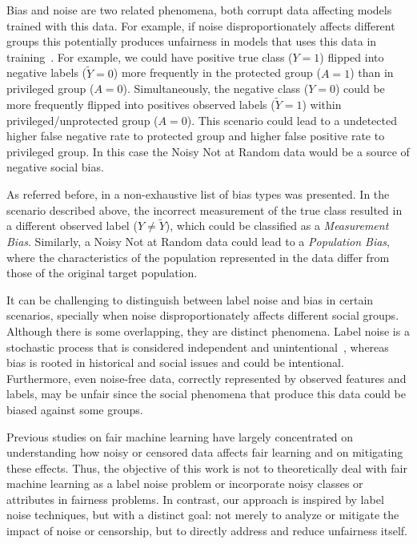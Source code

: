 Bias and noise are two related phenomena, both corrupt data affecting models trained with this data. For example, if noise disproportionately affects different groups this potentially produces unfairness in models that uses this data in training~\citep{Wang2021}. For example, we could have positive true class ($Y = 1$) flipped into negative labels ($\tilde{Y} =0$) more frequently in the protected group ($A = 1$) than in privileged group ($A = 0$). Simultaneously, the negative class ($Y = 0$) could be more frequently flipped into positives observed labels ($\tilde{Y} = 1$) within privileged/unprotected group ($A = 0$). This scenario could lead to a undetected higher false negative rate to protected group and higher false positive rate to privileged group. In this case the Noisy Not at Random data would be a source of negative social bias.

As referred before, in \cite{Mehrabi2019} a non-exhaustive list of bias types was presented. In the scenario described above, the incorrect measurement of the true class resulted in a different observed label ($Y \neq \tilde{Y}$), which could be classified as a \textit{Measurement Bias}. Similarly, a Noisy Not at Random data could lead to a \textit{Population Bias}, where the characteristics of the population represented in the data differ from those of the original target population.

It can be challenging to distinguish between label noise and bias in certain scenarios, specially when noise disproportionately affects different social groups. Although there is some overlapping, they are distinct phenomena. Label noise is a stochastic process that is considered independent and unintentional~\citep{Frenay2014}, whereas bias is rooted in historical and social issues and could be intentional. Furthermore, even noise-free data, correctly represented by observed features and labels, may be unfair since the social phenomena that produce this data could be biased against some groups.

Previous studies on fair machine learning have largely concentrated on understanding how noisy or censored data affects fair learning and on mitigating these effects. Thus, the objective of this work is not to theoretically deal with fair machine learning as a label noise problem or incorporate noisy classes or attributes in fairness problems. In contrast, our approach is inspired by label noise techniques, but with a distinct goal: not merely to analyze or mitigate the impact of noise or censorship, but to directly address and reduce unfairness itself.

